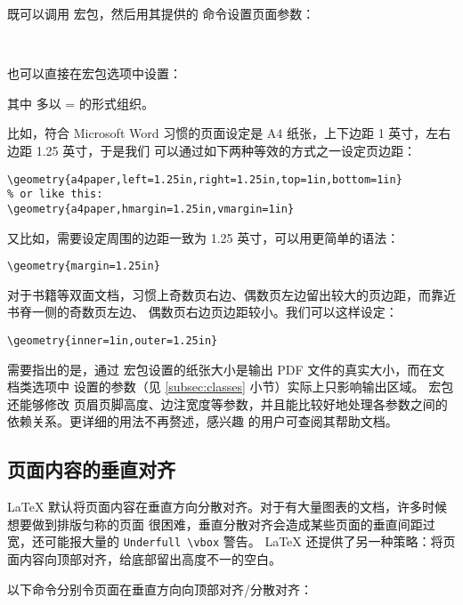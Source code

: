 既可以调用  宏包，然后用其提供的  命令设置页面参数：
\begin{command}
 \\
\end{command}
也可以直接在宏包选项中设置：
\begin{command}
\end{command}
其中  多以 = 的形式组织。

比如，符合 Microsoft Word 习惯的页面设定是 A4 纸张，上下边距 1 英寸，左右边距 1.25 英寸，于是我们
可以通过如下两种等效的方式之一设定页边距：
\begin{verbatim}
\geometry{a4paper,left=1.25in,right=1.25in,top=1in,bottom=1in}
% or like this:
\geometry{a4paper,hmargin=1.25in,vmargin=1in}
\end{verbatim}

又比如，需要设定周围的边距一致为 1.25 英寸，可以用更简单的语法：
\begin{verbatim}
\geometry{margin=1.25in}
\end{verbatim}

对于书籍等双面文档，习惯上奇数页右边、偶数页左边留出较大的页边距，而靠近书脊一侧的奇数页左边、
偶数页右边页边距较小。我们可以这样设定：
\begin{verbatim}
\geometry{inner=1in,outer=1.25in}
\end{verbatim}

需要指出的是，通过  宏包设置的纸张大小是输出 PDF 文件的真实大小，而在文档类选项中
设置的参数（见 \ref{subsec:classes} 小节）实际上只影响输出区域。 宏包还能够修改
页眉页脚高度、边注宽度等参数，并且能比较好地处理各参数之间的依赖关系。更详细的用法不再赘述，感兴趣
的用户可查阅其帮助文档。

\subsection{页面内容的垂直对齐}\label{subsec:raggedbottom}

\LaTeX{} 默认将页面内容在垂直方向分散对齐。对于有大量图表的文档，许多时候想要做到排版匀称的页面
很困难，垂直分散对齐会造成某些页面的垂直间距过宽，还可能报大量的 \verb|Underfull \vbox| 警告。
\LaTeX{} 还提供了另一种策略：将页面内容向顶部对齐，给底部留出高度不一的空白。

以下命令分别令页面在垂直方向向顶部对齐/分散对齐：
\begin{command}
 \\
\end{command}

